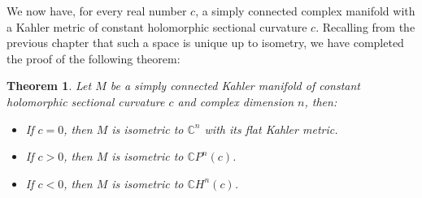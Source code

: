 \documentclass[11pt]{amsart}
\newtheorem{thm}[subsection]{Theorem}
\theoremstyle{definition}
\def \CP{ \mathbb{C}P }
\def \C{ \mathbb{C} }
\def \CH{ \mathbb{C}H }
\begin{document}
We now have, for every real number $c$, a simply connected complex manifold with a Kahler metric of constant holomorphic sectional curvature $c$.  Recalling from the previous chapter that such a space is unique up to isometry, we have completed the proof of the following theorem:

\begin{thm} Let $M$ be a simply connected Kahler manifold of constant holomorphic sectional curvature $c$ and complex dimension $n$, then:
%
\begin{itemize}
%
\item If $c = 0$, then $M$ is isometric to $\C^n$ with its flat Kahler metric.
\item If $c > 0$, then $M$ is isometric to $\CP^n (c)$.
\item If $c < 0$, then $M$ is isometric to $\CH^n (c)$.
%
\end{itemize}
%
\end{thm}
\end{document}
